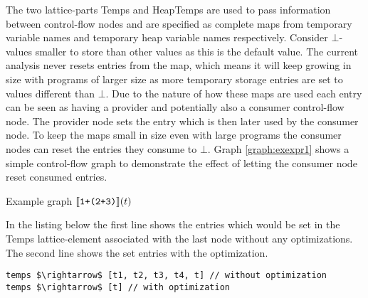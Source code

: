 The two lattice-parts Temps and HeapTemps are used to pass information between control-flow nodes and are specified as complete maps from temporary variable names and temporary heap variable names respectively. Consider $\bot$-values smaller to store than other values as this is the default value. The current analysis never resets entries from the map, which means it will keep growing in size with programs of larger size as more temporary storage entries are set to values different than $\bot$. Due to the nature of how these maps are used each entry can be seen as having a provider and potentially also a consumer control-flow node. The provider node sets the entry which is then later used by the consumer node. To keep the maps small in size even with large programs the consumer nodes can reset the entries they consume to $\bot$. Graph \ref{graph:exexpr1} shows a simple control-flow graph to demonstrate the effect of letting the consumer node reset consumed entries.
\begin{graph}
\centering
\begin{adjustbox}{max size={1\textwidth}{.25\textheight}, margin = 10pt}\end{adjustbox}

\caption{Example graph $\llbracket \texttt{1+(2+3)}\rrbracket(t)$}
\label{graph:exexpr1}
\end{graph}

In the listing below the first line shows the entries which would be set in the Temps lattice-element associated with the last node without any optimizations. The second line shows the set entries with the optimization.
\begin{lstlisting}[mathescape]
temps $\rightarrow$ [t1, t2, t3, t4, t] // without optimization
temps $\rightarrow$ [t] // with optimization
\end{lstlisting}

